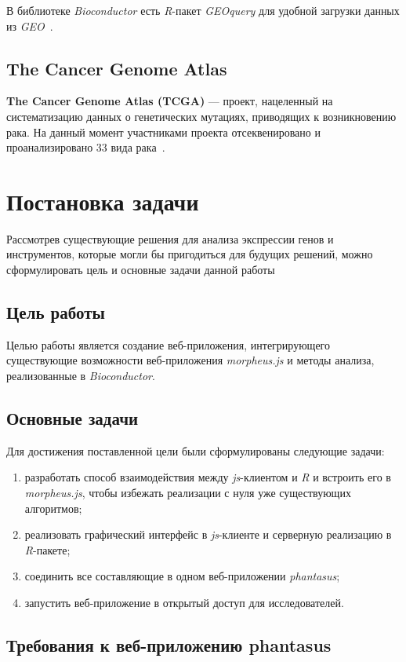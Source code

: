 В библиотеке \emph{Bioconductor} есть \emph{R}-пакет \emph{GEOquery} для удобной загрузки данных из \emph{GEO}~\cite{geoquery}.
\subsection{The Cancer Genome Atlas}
\textbf{The Cancer Genome Atlas (TCGA)} --- проект, нацеленный на систематизацию данных о генетических мутациях, приводящих к возникновению рака. На данный момент участниками проекта отсеквенировано и проанализировано 33 вида рака~\cite{tcga}.

\section{Постановка задачи}
Рассмотрев существующие решения для анализа экспрессии генов и инструментов, которые могли бы пригодиться для будущих решений, можно сформулировать цель и основные задачи данной работы

\subsection{Цель работы}
Целью работы является создание веб-приложения, интегрирующего существующие возможности веб-приложения \emph{morpheus.js} и методы анализа, реализованные в \emph{Bioconductor}.

\subsection{Основные задачи}
Для достижения поставленной цели были сформулированы следующие задачи:
\begin{enumerate}
\item разработать способ взаимодействия между \emph{js}-клиентом и \emph{R} и встроить его в \emph{morpheus.js}, чтобы избежать реализации с нуля уже существующих алгоритмов;
\item реализовать графический интерфейс в \emph{js}-клиенте и серверную реализацию в \emph{R}-пакете;
\item соединить все составляющие в одном веб-приложении \emph{phantasus};
\item запустить веб-приложение в открытый доступ для исследователей.
\end{enumerate}

\subsection{Требования к веб-приложению phantasus}
